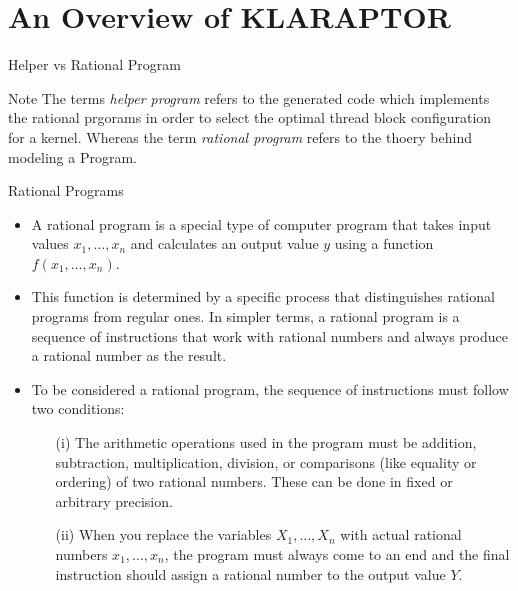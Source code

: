 \section{An Overview of KLARAPTOR}

\begin{frame}{Helper vs Rational Program}
    \begin{block}{Note}
        The terms {\em helper program} refers to the generated code which implements 
        the rational prgorams in order to select the optimal thread block configuration for a kernel.
        Whereas the term {\em rational program} refers to the thoery behind modeling a Program.
    \end{block}
\end{frame}

\begin{frame}{Rational Programs}
    \begin{block}{}
        \begin{itemize}
            \item A rational program is a special type of computer program that takes input values $x_1, \ldots, x_n$ and 
            calculates an output value $y$ using a function $f(x_1, \ldots, x_n)$.
            \item This function is determined by a specific process that distinguishes rational programs from regular ones. In simpler terms, 
            a rational program is a sequence of instructions that work with rational numbers and always produce a rational number as the result.
            \item To be considered a rational program, the sequence of instructions must follow two conditions:
            \begin{itemize}
                \item [(i)] The arithmetic operations used in the program must be addition, subtraction, multiplication, division, or comparisons (like equality or ordering) of two rational numbers. 
                These can be done in fixed or arbitrary precision.
                \item [(ii)] When you replace the variables $X_1, \ldots, X_n$ with actual rational numbers $x_1, \ldots, x_n$, the program must always come to an end and 
                the final instruction should assign a rational number to the output value $Y$.
            \end{itemize}
        \end{itemize}
    \end{block}
\end{frame}

